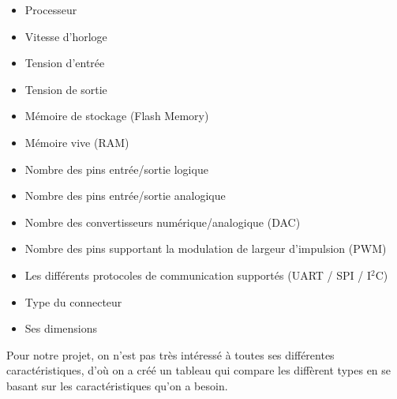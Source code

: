 \begin{itemize}
    \item Processeur
    \item Vitesse d'horloge
    \item Tension d'entrée
    \item Tension de sortie
    \item Mémoire de stockage (Flash Memory)
    \item Mémoire vive (\acrshort{RAM})
    \item Nombre des pins entrée/sortie logique
    \item Nombre des pins entrée/sortie analogique
    \item Nombre des convertisseurs numérique/analogique (\acrshort{DAC})
    \item Nombre des pins supportant la modulation de largeur d'impulsion (\acrshort{PWM})
    \item Les différents protocoles de communication supportés (UART / SPI / I\(^2\)C)
    \item Type du connecteur
    \item Ses dimensions
\end{itemize}

Pour notre projet, on n'est pas très intéressé à toutes ses différentes caractéristiques, d'où on a créé un tableau qui compare les diffèrent types en se basant sur les caractéristiques qu'on a besoin.


